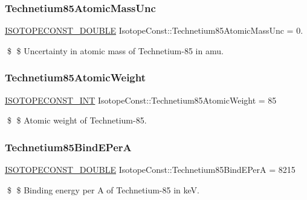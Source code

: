 \subsubsection{\texorpdfstring{Technetium85\+Atomic\+Mass\+Unc}{Technetium85AtomicMassUnc}}
{\footnotesize\ttfamily \mbox{\hyperlink{group___isotope_const-_macros_ga8f45a7272ce02c0b4c65c44636ed719a}{I\+S\+O\+T\+O\+P\+E\+C\+O\+N\+S\+T\+\_\+\+D\+O\+U\+B\+LE}} Isotope\+Const\+::\+Technetium85\+Atomic\+Mass\+Unc = 0.}

\$ \$ Uncertainty in atomic mass of Technetium-\/85 in amu. \mbox{\label{group___isotope_const-_technetium-_tc85_ga3a9a4666a9a1212a47209bd3ee9772ac}} 
\subsubsection{\texorpdfstring{Technetium85\+Atomic\+Weight}{Technetium85AtomicWeight}}
{\footnotesize\ttfamily \mbox{\hyperlink{group___isotope_const-_macros_ga5f18360b3e99483a35c32d789e62621c}{I\+S\+O\+T\+O\+P\+E\+C\+O\+N\+S\+T\+\_\+\+I\+NT}} Isotope\+Const\+::\+Technetium85\+Atomic\+Weight = 85}

\$ \$ Atomic weight of Technetium-\/85. \mbox{\label{group___isotope_const-_technetium-_tc85_gacaa3f7e77c052ae30288c5c03e8f93be}} 
\subsubsection{\texorpdfstring{Technetium85\+Bind\+E\+PerA}{Technetium85BindEPerA}}
{\footnotesize\ttfamily \mbox{\hyperlink{group___isotope_const-_macros_ga8f45a7272ce02c0b4c65c44636ed719a}{I\+S\+O\+T\+O\+P\+E\+C\+O\+N\+S\+T\+\_\+\+D\+O\+U\+B\+LE}} Isotope\+Const\+::\+Technetium85\+Bind\+E\+PerA = 8215}

\$ \$ Binding energy per A of Technetium-\/85 in keV. \mbox{\label{group___isotope_const-_technetium-_tc85_ga91974107ac53472291f5059c012d827a}} 
